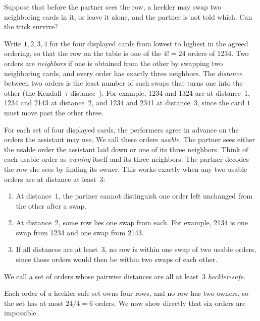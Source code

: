 \documentclass[11pt]{article}
\begin{document}
Suppose that before the partner sees the row, a heckler may swap two neighboring cards in it, or leave it alone, and the partner is not told which. Can the trick survive?

Write $1,2,3,4$ for the four displayed cards from lowest to highest in the agreed ordering, so that the row on the table is one of the $4!=24$ orders of 1234. Two orders are \emph{neighbors} if one is obtained from the other by swapping two neighboring cards, and every order has exactly three neighbors. The \emph{distance} between two orders is the least number of such swaps that turns one into the other (the Kendall~$\tau$ distance~\cite{Kendall38}). For example, 1234 and 1324 are at distance~1, 1234 and 2143 at distance~2, and 1234 and 2341 at distance~3, since the card $1$ must move past the other three.

For each set of four displayed cards, the performers agree in advance
on the orders the assistant may use. We call these orders \emph{usable}.
The
partner sees either the usable order the assistant laid down or one of
its three neighbors. Think of each usable order as \emph{owning} itself and its three neighbors.
The partner decodes the row she sees by finding its owner. This works exactly when any two usable orders are at distance at least~3:
\begin{enumerate}
\item At distance~1, the partner cannot distinguish one order left unchanged from the other after a swap.
\item At distance~2, some row lies one swap from each. For example, 2134 is one swap from 1234 and one swap from 2143.
\item If all distances are at least~3, no row is within one swap of two usable orders, since those orders would then be within two swaps of each other.
\end{enumerate}
We call a set of orders whose pairwise distances are all at least~3 \emph{heckler-safe}.

Each order of a heckler-safe set owns four rows, and no row
has two owners, so the set has at most $24/4=6$ orders.
We now show directly that six orders are impossible.
\end{document}
